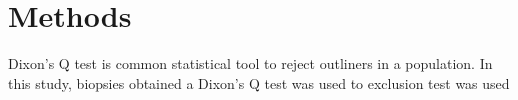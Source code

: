 \chapter{Methods}

Dixon's Q test is common statistical tool to reject outliners in a population. In this study, biopsies obtained a Dixon's Q test was used to   exclusion test was used 